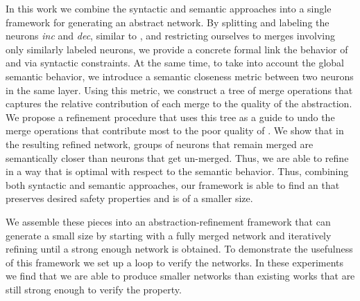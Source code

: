 
In this work we combine the syntactic and semantic approaches into a single
framework for generating an abstract network. By splitting and labeling the
neurons \textit{inc} and \textit{dec}, similar to \cite{cegar-nn}, and
restricting ourselves to merges involving only similarly labeled neurons, we
provide a concrete formal link the behavior of \cnc and \abs via
syntactic constraints. At the same time, to take into account the global
semantic behavior, we introduce a semantic closeness metric between two neurons
in the same layer. Using this metric, we construct a tree of merge operations
that captures the relative contribution of each merge to the quality of the
abstraction. We propose a refinement procedure  that uses
this tree as a guide
to undo the merge operations that contribute most to the poor quality of \abs.
We show that in the resulting refined network, groups of neurons that remain
merged are semantically closer than neurons that get un-merged. Thus, we are
able to refine \abs in a way that is optimal with respect to the semantic
behavior. Thus, combining both syntactic and semantic approaches, our framework
is able to find an \abs that preserves desired safety properties and is of a
smaller size.

We assemble these pieces into an abstraction-refinement framework  that can
generate a small size \abs by starting with a fully merged network and
iteratively refining until a strong enough network is obtained. To demonstrate
the usefulness of this framework we set up a
\cegar loop  
to verify the \acasxu networks. In these experiments we find that we
are able to produce smaller networks than existing works that are still strong
enough to verify the property.


